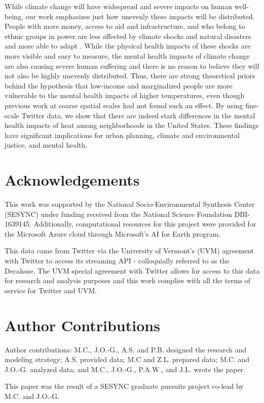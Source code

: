 \documentclass[titlepage]{article}
\begin{document}
While climate change will have widespread and severe impacts on human well-being, our work emphasizes just how unevenly these impacts will be distributed. People with more money, access to aid and infrastructure, and who belong to ethnic groups in power are less affected by climate shocks and natural disasters and more able to adapt \citep{bullard2012wrong}. While the physical health impacts of these shocks are more visible and easy to measure, the mental health impacts of climate change are also causing severe human suffering and there is no reason to believe they will not also be highly unevenly distributed. Thus, there are strong theoretical priors behind the hypothesis that low-income and marginalized people are more vulnerable to the mental health impacts of higher temperatures, even though previous work at coarse spatial scales had not found such an effect. By using fine-scale Twitter data, we show that there are indeed stark differences in the mental health impacts of heat among neighborhoods in the United States. These findings have significant implications for urban planning, climate and environmental justice, and mental health.

\section*{Acknowledgements}
This work was supported by the National Socio-Environmental Synthesis Center (SESYNC) under funding received from the National Science Foundation DBI-1639145. Additionally, computational resources for this project were provided for the Microsoft Azure cloud through Microsoft's AI for Earth program.

This data came from Twitter via the University of Vermont’s (UVM) agreement with Twitter to access its streaming API - colloquially referred to as the Decahose. The UVM special agreement with Twitter allows for access to this data for research and analysis purposes and this work complies with all the terms of service for Twitter and UVM. 


\section*{Author Contributions}
Author contributions: M.C., J.O.-G., A.S. and P.B. designed the research and modeling strategy; A.S. provided data; M.C and Z.L. prepared data; M.C. and J.O.-G. analyzed data; and M.C., J.O.-G., P.A.W., and J.L. wrote the paper.

\noindent This paper was the result of a SESYNC graduate pursuits project co-lead by M.C. and J.O.-G.


\end{document}

